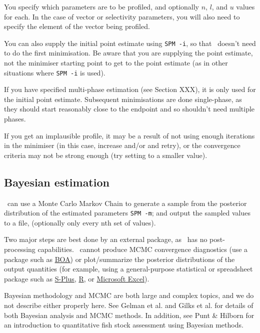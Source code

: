 You specify which parameters are to be profiled, and optionally $n$, $l$, and $u$ values for each. In the case of vector or selectivity parameters, you will also need to specify the element of the vector being profiled. 

You can also supply the initial point estimate using \texttt{SPM -i}, so that \SPM\ doesn't need to do the first minimisation. Be aware that you are supplying the point estimate, not the minimiser starting point to get to the point estimate (as in other situations where \texttt{SPM -i} is used).

If you have specified multi-phase estimation (see Section XXX), it is only used for the initial point estimate. Subsequent minimisations are done single-phase, as they should start reasonably close to the endpoint and so shouldn't need multiple phases.

If you get an implausible profile, it may be a result of not using enough iterations in the minimiser (in this case, increase  and/or  and retry), or the convergence criteria may not be strong enough (try setting  to a smaller value).

\subsection{Bayesian estimation}

\SPM\ can use a Monte Carlo Markov Chain to generate a sample from the posterior distribution of the estimated parameters \texttt{SPM -m}; and output the sampled values to a file, (optionally only every nth set of values).

Two major steps are best done by an external package, as \SPM\ has no post-processing capabilities. \SPM\ cannot produce MCMC convergence diagnostics (use a package such as \href{http://www.public-health.uiowa.edu/boa}{BOA}) or plot/summarize the posterior distributions of the output quantities (for example, using a general-purpose statistical or spreadsheet package such as \href{http://www.insightful.com}{S-Plus}, \href{http://www.r-project.org}{R}, or \href{http://www.microsoft.com}{Microsoft Excel}).

Bayesian methodology and MCMC are both large and complex topics, and we do not describe either properly here. See Gelman et al. \citeyearpar{823} and Gilks et al. \citeyearpar{143} for details of both Bayesian analysis and MCMC methods. In addition, see Punt \& Hilborn \citeyearpar{828} for an introduction to quantitative fish stock assessment using Bayesian methods. 

